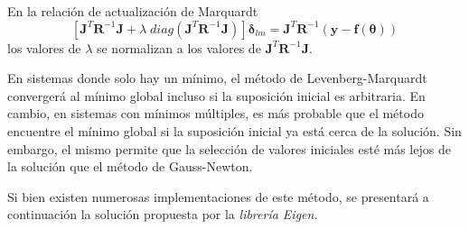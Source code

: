 En la relación de actualización de Marquardt
\begin{equation}
    \left[\bm{J}^T\bm{R}^{-1}\bm{J} + \lambda\;  diag(\bm{J}^T\bm{R}^{-1}\bm{J})\right]\bm{\delta}_{lm} = \bm{J}^T\bm{R}^{-1}\left(\bm{y} - \bm{f}(\bm{\theta})\right)
\end{equation}{}
los valores de $\lambda$ se normalizan a los valores de $\bm{J}^T\bm{R}^{-1}\bm{J}$.

En sistemas donde solo hay un mínimo, el método de Levenberg-Marquardt convergerá al mínimo global incluso si la suposición inicial es arbitraria. En cambio, en sistemas con mínimos múltiples, es más probable que el método encuentre el mínimo global si la suposición inicial ya está cerca de la solución. Sin embargo, el mismo permite que la selección de valores iniciales esté más lejos de la solución que el método de Gauss-Newton.

Si bien existen numerosas implementaciones de este método, se presentará a continuación la solución propuesta por la \textit{librería Eigen}.
